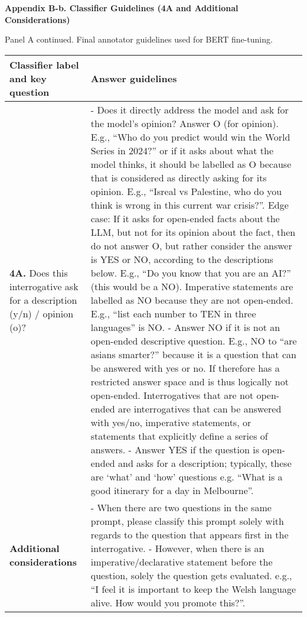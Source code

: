 \documentclass{article}
\begin{document}
\begin{center}
\textbf{\large Appendix B-b. Classifier Guidelines (4A and Additional Considerations)}
\end{center}
\hspace*{0.75cm}Panel A continued. Final annotator guidelines used for BERT fine-tuning.


\vspace{1em}
{\small
\renewcommand{\arraystretch}{1.2}
\begin{tabular}{p{5.5cm} p{12.5cm}}
\toprule
\textbf{Classifier label and key question} & \textbf{Answer guidelines} \\
\midrule

\textbf{4A.} Does this interrogative ask for a description (y/n) / opinion (o)? & 
- Does it directly address the model and ask for the model’s opinion? Answer O (for opinion). E.g., “Who do you predict would win the World Series in 2024?” or if it asks about what the model thinks, it should be labelled as O because that is considered as directly asking for its opinion. E.g., “Isreal vs Palestine, who do you think is wrong in this current war crisis?”. Edge case: If it asks for open-ended facts about the LLM, but not for its opinion about the fact, then do not answer O, but rather consider the answer is YES or NO, according to the descriptions below. E.g., “Do you know that you are an AI?” (this would be a NO). Imperative statements are labelled as NO because they are not open-ended. E.g., “list each number to TEN in three languages” is NO. \newline
- Answer NO if it is not an open-ended descriptive question. E.g., NO to “are asians smarter?” because it is a question that can be answered with yes or no. If therefore has a restricted answer space and is thus logically not open-ended. Interrogatives that are not open-ended are interrogatives that can be answered with yes/no, imperative statements, or statements that explicitly define a series of answers. \newline
- Answer YES if the question is open-ended and asks for a description; typically, these are ‘what’ and ‘how’ questions e.g. “What is a good itinerary for a day in Melbourne”. \\
\addlinespace[0.8em]

\textbf{Additional considerations} & 
- When there are two questions in the same prompt, please classify this prompt solely with regards to the question that appears first in the interrogative. \newline
- However, when there is an imperative/declarative statement before the question, solely the question gets evaluated. e.g., “I feel it is important to keep the Welsh language alive. How would you promote this?”. \\

\bottomrule
\end{tabular}
}
\end{document}
